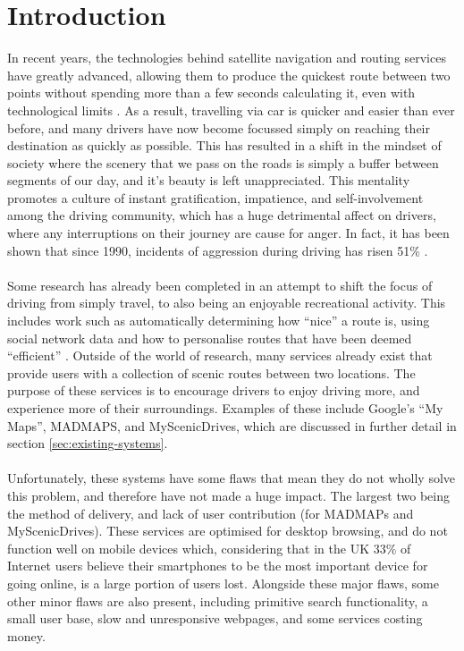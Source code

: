 \section{Introduction}
In recent years, the technologies behind satellite navigation and routing services have greatly advanced, allowing them to produce the quickest route between two points without spending more than a few seconds calculating it, even with technological limits \cite{lou2009map}. As a result, travelling via car is quicker and easier than ever before, and many drivers have now become focussed simply on reaching their destination as quickly as possible. This has resulted in a shift in the mindset of society where the scenery that we pass on the roads is simply a buffer between segments of our day, and it's beauty is left unappreciated. This mentality promotes a  culture of instant gratification, impatience, and self-involvement among the driving community, which has a huge detrimental affect on drivers, where any interruptions on their journey are cause for anger. In fact, it has been shown that since 1990, incidents of aggression during driving has risen 51\% \cite{vest1997road}. \ \\
\ \\
Some research has already been completed in an attempt to shift the focus of driving from simply travel, to also being an enjoyable recreational activity. This includes work such as automatically determining how ``nice'' a route is, using social network data \cite{peregrino2012mapping}\cite{van2011time} and how to personalise routes that have been deemed ``efficient'' \cite{chen2011discovering}. Outside of the world of research, many services already exist that provide users with a collection of scenic routes between two locations. The purpose of these services is to encourage drivers to enjoy driving more, and experience more of their surroundings. Examples of these include Google's ``My Maps''\cite{url2015gmaps}, MADMAPS\cite{url2015madmaps}, and MyScenicDrives\cite{url2015myscenicdrives}, which are discussed in further detail in section \ref{sec:existing-systems}.\ \\
\ \\
Unfortunately, these systems have some flaws that mean they do not wholly solve this problem, and therefore have not made a huge impact. The largest two being the method of delivery, and lack of user contribution (for MADMAPs and MyScenicDrives). These services are optimised for desktop browsing, and do not function well on mobile devices which, considering that in the UK 33\% of Internet users believe their smartphones to be the most important device for going online\cite{ofcom2015comms}, is a large portion of users lost. Alongside these major flaws, some other minor flaws are also present, including primitive search functionality, a small user base, slow and unresponsive webpages, and some services costing money.\ \\
